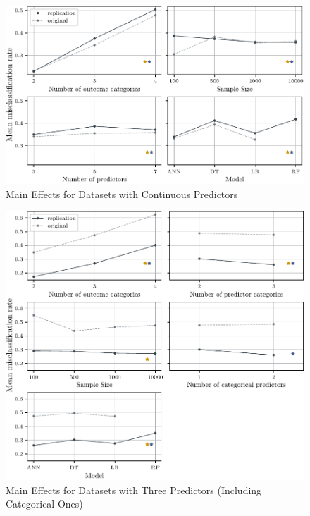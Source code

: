 \documentclass[12pt]{article}
\begin{document}
\begin{figure}[h]
    \centering
    \includegraphics{fig/01_mainEffects_cont.pdf}
    \caption{Main Effects for Datasets with Continuous Predictors}
    \label{fig:01_mainEffects_cont}
\end{figure}

\begin{figure}[h]
    \centering
    \includegraphics{fig/05_mainEffects_V3.pdf}
    \caption{Main Effects for Datasets with Three Predictors (Including Categorical Ones)}
    \label{fig:05_mainEffects_V3}
\end{figure}
\end{document}
